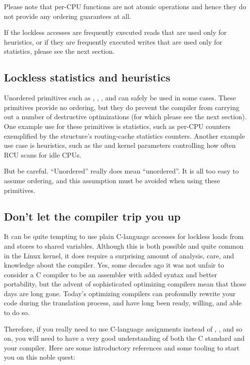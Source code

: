 Please note that per-CPU functions are not atomic operations and
hence they do not provide any ordering guarantees at all.

If the lockless accesses are frequently executed reads that are used
only for heuristics, or if they are frequently executed writes that
are used only for statistics, please see the next section.


\subsection{Lockless statistics and heuristics}

Unordered primitives such as , ,
, and  can safely be used in some cases.
These primitives provide no ordering, but they do prevent the compiler
from carrying out a number of destructive optimizations (for which
please see the next section).
One example use for these primitives is statistics, such as per-CPU
counters exemplified by the  structure's routing-cache
statistics counters.
Another example use case is heuristics, such as the
 and  kernel parameters
controlling how often RCU scans for idle CPUs.

But be careful.
``Unordered'' really does mean ``unordered''.
It is all too easy to assume ordering, and this assumption must be
avoided when using these primitives.


\subsection{Don't let the compiler trip you up}

It can be quite tempting to use plain C-language accesses for lockless
loads from and stores to shared variables.
Although this is both possible and quite common in the Linux kernel,
it does require a surprising amount of analysis, care, and knowledge
about the compiler.
Yes, some decades ago it was not unfair to consider a C compiler to be
an assembler with added syntax and better portability, but the advent of
sophisticated optimizing compilers mean that those days are long gone.
Today's optimizing compilers can profoundly rewrite your code during the
translation process, and have long been ready, willing, and able to do so.

Therefore, if you really need to use C-language assignments instead of
, , and so on, you will need to have a very good
understanding of both the C standard and your compiler.
Here are some introductory references and some tooling to start you on
this noble quest:


